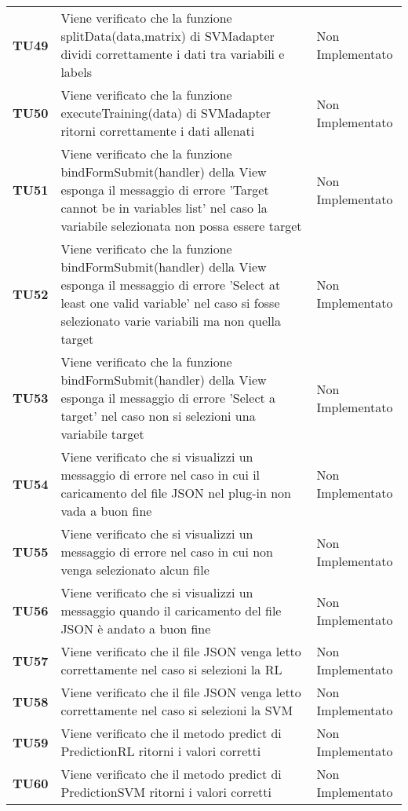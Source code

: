 \documentclass[../piano-di-qualifica.tex]{subfiles}
\begin{document}
\begin{longtable}[H]{>{\centering\bfseries}m{2.5cm} >{\centering}m{7.5cm} >{\centering\arraybackslash}m{3.5cm}}
  \textbf{TU49} & Viene verificato che la funzione splitData(data,matrix) di SVMadapter dividi correttamente i dati tra variabili e labels & Non Implementato \\
  \textbf{TU50} & Viene verificato che la funzione executeTraining(data) di SVMadapter ritorni correttamente i dati allenati & Non Implementato \\
  \textbf{TU51} & Viene verificato che la funzione bindFormSubmit(handler) della View esponga il messaggio di errore 'Target cannot be in variables list' nel caso la variabile selezionata non possa essere target  & Non Implementato \\
  \textbf{TU52} & Viene verificato che la funzione bindFormSubmit(handler) della View esponga il messaggio di errore 'Select at least one valid variable' nel caso si fosse selezionato varie variabili ma non quella target  & Non Implementato \\
  \textbf{TU53} & Viene verificato che la funzione bindFormSubmit(handler) della View esponga il messaggio di errore 'Select a target' nel caso non si selezioni una variabile target  & Non Implementato \\
  \textbf{TU54} & Viene verificato che si visualizzi un messaggio di errore nel caso in cui il caricamento del file JSON nel plug-in non vada a buon fine & Non Implementato \\
  \textbf{TU55} & Viene verificato che si visualizzi un messaggio di errore nel caso in cui non venga selezionato alcun file & Non Implementato \\
  \textbf{TU56} & Viene verificato che si visualizzi un messaggio quando il caricamento del file JSON è andato a buon fine & Non Implementato \\
  \textbf{TU57} & Viene verificato che il file JSON venga letto correttamente nel caso si selezioni la RL & Non Implementato \\
  \textbf{TU58} & Viene verificato che il file JSON venga letto correttamente nel caso si selezioni la SVM & Non Implementato \\
  \textbf{TU59} & Viene verificato che il metodo predict di PredictionRL ritorni i valori corretti & Non Implementato \\
  \textbf{TU60} & Viene verificato che il metodo predict di PredictionSVM ritorni i valori corretti & Non Implementato \\
\end{longtable}
\end{document}
